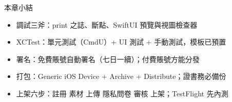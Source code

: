 \begin{tcbsummary}{本章小結}
\begin{itemize}
  \item 調試三斧：print 之誌、斷點、SwiftUI 預覽與視圖檢查器
  \item XCTest：單元測試（CmdU）+ UI 測試 + 手動測試，模板已預置
  \item 署名：免費賬號自動署名（七日一續）；付費賬號方能分發
  \item 打包：Generic iOS Device + Archive + Distribute；證書務必備份
  \item 上架六步：註冊 素材 上傳 隱私問卷 審核 上架；TestFlight 先內測
\end{itemize}

\end{tcbsummary}
